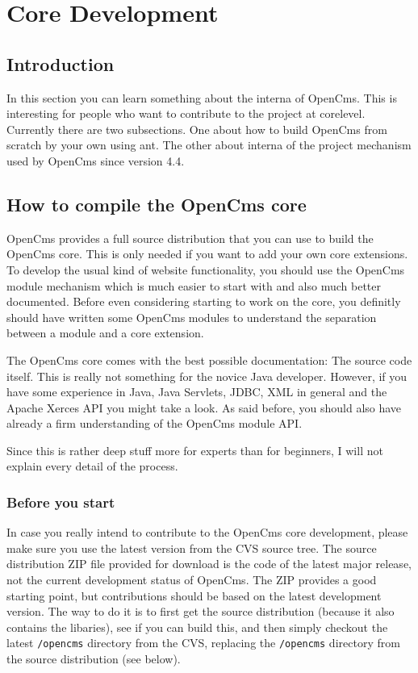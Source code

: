 \chapter{Core Development}

\section{Introduction}

In this section you can learn something about the interna of OpenCms. This
is interesting for people who want to contribute to the project at 
core\-level. Currently there are two subsections. One about how to build
OpenCms from scratch by your own using ant. The other about interna of the
project mechanism used by OpenCms since version 4.4.

\section{How to compile the OpenCms core}
OpenCms provides a full source distribution that you can use to build the
OpenCms core. This is only needed if you want to add your own core 
extensions. To develop the usual kind of website functionality, you 
should use the OpenCms module mechanism which is much easier to start with 
and also much better documented. Before even considering starting to work 
on the core, you definitly should have written some OpenCms modules to 
understand the separation between a module and a core extension. 

The OpenCms core comes with the best possible documentation: The source
code itself. This is really not something for the novice Java developer.
However, if you have some experience in Java, Java Servlets, JDBC, XML in 
general and the Apache Xerces API you might take a look. As said before, 
you should also have already a firm understanding of the OpenCms module API. 

Since this is rather deep stuff more for experts than for beginners, I 
will not explain every detail of the process.

\subsection{Before you start}

In case you really intend to contribute to the OpenCms core development, 
please make sure you use the latest version from the CVS source tree. The
source distribution ZIP file provided for download is the code of the latest
major release, not the current development status of OpenCms. The ZIP provides
a good starting point, but contributions should be based on the latest 
development version. The way to do it is to first get the source distribution 
(because it also contains the libaries), see if you can build this, and then 
simply checkout the latest \texttt{/opencms} directory from the CVS, replacing the 
\texttt{/opencms} directory from the source distribution (see below).

